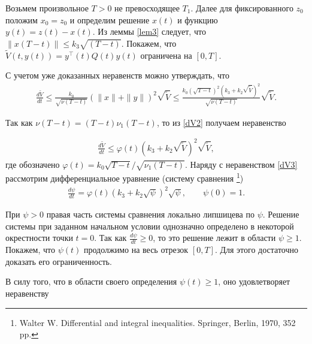 \documentclass[../main.tex]{subfiles}
\begin{document}
Возьмем произвольное $T>0$ не превосходящее $T_1$. Далее для фиксированного $z_0$ положим $x_0=z_0$ и определим решение $x(t)$ и функцию $y(t)=z(t)-x(t)$.  Из леммы \ref{lem3} следует, что  $\|x(T - t) \| \leqslant k_3\sqrt{(T - t)} $.  Покажем, что  $ \widetilde{V}(t,y(t))= y^{\top}(t) Q(t) y(t) $ ограничена на $[0, T]$.

С учетом уже доказанных неравенств можно утверждать, что
\begin{gather}\label{dV2}
    \frac{d\widetilde{V}}{dt} \leqslant \frac{k_0}{\sqrt{\nu(T - t)}} (\|x \| + \|y \|)^2 \sqrt{\widetilde{V}} \leqslant \frac{k_0 (\sqrt{T - t})^2 (k_3 + k_2 \sqrt{\widetilde{V}})^2 }{\sqrt{\nu(T - t)}} \sqrt{\widetilde{V}}.
\end{gather}



Так как $\nu (T - t) = (T - t) \nu_1 (T - t)$,
то из \eqref{dV2} получаем неравенство

\begin{gather}\label{dV3}
        \frac{d\widetilde{V}}{dt} \leqslant \varphi(t) \left(k_3 + k_2\sqrt{\widetilde{V}}\right)^2 \sqrt{\widetilde{V}},
\end{gather}
где  обозначено $\varphi (t) = k_0 \sqrt{T - t} / \sqrt{\nu_1 (T - t)}.$
Наряду с неравенством \eqref{dV3} рассмотрим  дифференциальное уравнение (систему сравнения \footnote{Walter W. Differential and integral inequalities. Springer, Berlin, 1970, 352 pp.})
\begin{gather*}
        \frac{d\psi}{dt} = \varphi (t) \left(k_3 + k_2\sqrt{\psi}\right)^2 \sqrt{\psi}, \qquad \psi (0) = 1.
\end{gather*}

При $\psi>0$ правая часть системы сравнения локально липшицева по $\psi$. Решение системы при заданном начальном условии однозначно определено  в некоторой окрестности точки $t=0$.  
 Так как $\frac{d\psi}{dt} \geqslant 0$, то это решение лежит в области $\psi\geqslant1$. Покажем, что $\psi(t)$ продолжимо на весь отрезок $[0,T]$. Для этого достаточно доказать его ограниченность.   
 
 В силу того, что   в области своего определения $\psi(t)\geqslant1$, оно удовлетворяет неравенству 
\end{document}
